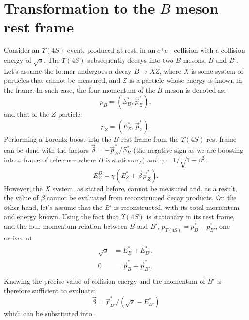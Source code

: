 \chapter{Transformation to the \texorpdfstring{$B$}{B} meson rest frame} \label{sec:appendix_boosting_to_b_frame}

Consider an $\Upsilon(4S)$ event, produced at rest, in an $e^+e^-$ collision with a collision energy of $\sqrt{s}$.
The $\Upsilon(4S)$ subsequently decays into two $B$ mesons, $B$ and $B'$.
Let's assume the former undergoes a decay $B\to X Z$, where $X$ is some system of particles that cannot be measured, and $Z$ is a particle whose energy is known in the \FourS frame.
In such case, the four-momentum of the $B$ meson is denoted as:
\begin{equation}
	p_{B} = (E_B^*,\vec{p}_{B}^*),
\end{equation}
and that of the $Z$ particle:
\begin{equation}
	p_{Z} = (E_{Z}^*,\vec{p}_{Z}^*).
\end{equation}
Performing a Lorentz boost into the $B$ rest frame from the $\Upsilon(4S)$ rest frame can be done
with the factors $\vec{\beta}=-\vec{p}_{B}^*/E_{B}^*$ (the negative sign as we are boosting into a frame of reference where $B$ is stationary)
and $\gamma = 1/\sqrt{1-\beta^2}$:
\begin{equation}\label{eq:egamma}
	E_{Z}^B = \gamma(E_{Z}^* + \vec{\beta}\vec{p}_{Z}^*). 
\end{equation}
However, the $X$ system, as stated before, cannot be measured and, as a result, the value of $\beta$ cannot be evaluated from reconstructed decay products.
On the other hand, let's assume that the $B'$ is reconstructed, with its total momentum and energy known.
Using the fact that $\Upsilon(4S)$ is stationary in its rest frame, and the four-momentum relation between $B$ and $B'$,
$p_{\Upsilon(4S)}=p_B^*+p^*_{B'}$, one arrives at
\begin{align}
	\begin{split}
		\sqrt{s} &= E^*_{B}+E^*_{B'},\\
		0 &= \vec{p}_B^* + \vec{p}^*_{B'}.\\
	\end{split}
\end{align}
Knowing the precise value of collision energy and the momentum of $B'$ is therefore sufficient to evaluate:
\begin{equation}
	\vec{\beta}= \vec{p}^*_{B'}/(\sqrt{s}-E^*_{B'})
\end{equation}
which can be substituted into .

